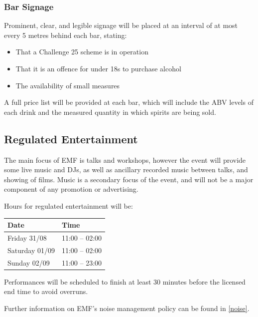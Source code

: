 \subsubsection{Bar Signage}

Prominent, clear, and legible signage will be placed at an interval of at most
every 5 metres behind each bar, stating:

\begin{itemize}
\tightlist
\item That a Challenge 25 scheme is in operation
\item That it is an offence for under 18s to purchase alcohol
\item The availability of small measures
\end{itemize}

A full price list will be provided at each bar, which will include the ABV levels
of each drink and the measured quantity in which spirits are being sold.

\subsection{Regulated Entertainment}

The main focus of EMF is talks and workshops, however the event will provide
some live music and DJs, as well as ancillary recorded music between talks, and
showing of films. Music is a secondary focus of the event, and will not be a major
component of any promotion or advertising.

Hours for regulated entertainment will be:

\begin{table}[h!]
    \centering
    \begin{tabular}{| l l |}
        \hline
        \textbf{Date} & \textbf{Time} \\
        \hline
        Friday 31/08 & 11:00 -- 02:00 \\
        Saturday 01/09 & 11:00 -- 02:00 \\
        Sunday 02/09 & 11:00 -- 23:00 \\
        \hline
    \end{tabular}
\end{table}

Performances will be scheduled to finish at least 30 minutes before the
licensed end time to avoid overruns.

Further information on EMF's noise management policy can be found in
\cref{noise}.

